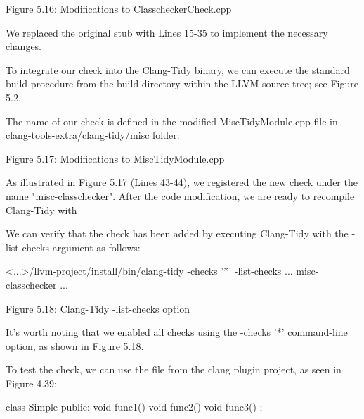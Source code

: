 \begin{center}
Figure 5.16: Modifications to ClasscheckerCheck.cpp
\end{center}

We replaced the original stub with Lines 15-35 to implement the necessary changes.

To integrate our check into the Clang-Tidy binary, we can execute the standard build procedure from the build directory within the LLVM source tree; see Figure 5.2.

The name of our check is defined in the modified MiscTidyModule.cpp file in clang-tools-extra/clang-tidy/misc folder:

\begin{cpp}
class MiscModule : public ClangTidyModule {
public:
  void addCheckFactories(ClangTidyCheckFactories &CheckFactories) override {
    CheckFactories.registerCheck<ClasscheckerCheck>(
      "misc-classchecker");
    CheckFactories.registerCheck<ConfusableIdentifierCheck>(
      "misc-confusable-identifiers");
\end{cpp}

\begin{center}
Figure 5.17: Modifications to MiscTidyModule.cpp
\end{center}

As illustrated in Figure 5.17 (Lines 43-44), we registered the new check under the name "misc-classchecker". After the code modification, we are ready to recompile Clang-Tidy with


We can verify that the check has been added by executing Clang-Tidy with the -list-checks argument as follows:

\begin{shell}
<...>/llvm-project/install/bin/clang-tidy -checks '*' -list-checks
...
misc-classchecker
...
\end{shell}

\begin{center}
Figure 5.18: Clang-Tidy -list-checks option
\end{center}

It's worth noting that we enabled all checks using the -checks '*' command-line option, as shown in Figure 5.18.

To test the check, we can use the file from the clang plugin project, as seen in Figure 4.39:

\begin{cpp}
class Simple {
public:
  void func1() {}
  void func2() {}
  void func3() {}
};
\end{cpp}

